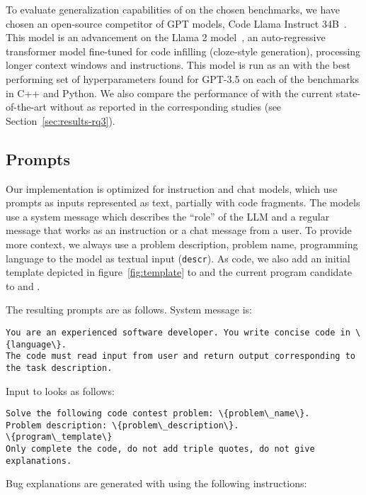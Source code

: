 To evaluate generalization capabilities of \method{} on the chosen benchmarks, we have chosen an open-source competitor of GPT models, Code Llama Instruct 34B~\cite{roziereCodeLlamaOpen2023}. 
This model is an advancement on the Llama 2 model~\cite{touvron2023:llama}, an auto-regressive transformer model fine-tuned for code infilling (cloze-style generation), processing longer context windows and instructions.
This model is run as an with the best performing set of hyperparameters found for GPT-3.5 on each of the benchmarks in C++ and Python.
We also compare the performance of \method{} with the current state-of-the-art without \method{} as reported in the corresponding studies (see Section~\ref{sec:results-rq3}).

\newpage \subsection{Prompts}
\label{sec:prompts}

Our implementation is optimized for instruction and chat models, which use prompts as inputs represented as text, partially with code fragments.
The models use a system message which describes the ``role'' of the LLM and a regular message that works as an instruction or a chat message from a user.
To provide more context, we always use a problem description, problem name, programming language to the model as textual input (\texttt{descr}). 
As code, we also add an initial template depicted in figure~\ref{fig:template} to \synthmodel{} and the current program candidate to \textmodel{} and \debugmodel{}.

The resulting prompts are as follows.
System message is: 

\begin{lstlisting}
You are an experienced software developer. You write concise code in \{language\}.
The code must read input from user and return output corresponding to the task description.
\end{lstlisting}

Input to \synthmodel{} looks as follows:

\begin{lstlisting}
Solve the following code contest problem: \{problem\_name\}. 
Problem description: \{problem\_description\}.
\{program\_template\}
Only complete the code, do not add triple quotes, do not give explanations.
\end{lstlisting}

Bug explanations are generated with \textmodel{} using the following instructions:

